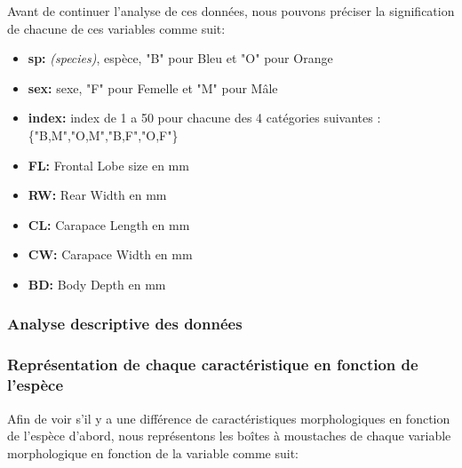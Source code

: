 \documentclass[10pt]{article}
\begin{document}
	Avant de continuer l'analyse de ces données, nous pouvons préciser la signification de chacune de ces variables comme suit:
	\begin{itemize}
		\item \textbf{sp:} \textit{(species)}, espèce, "B" pour Bleu et "O" pour Orange
		\item \textbf{sex:} sexe, "F" pour Femelle et "M" pour Mâle
		\item \textbf{index:} index de 1 a 50 pour chacune des 4 catégories suivantes : \{"B,M","O,M","B,F","O,F"\}
		\item \textbf{FL:} Frontal Lobe size en mm
		\item \textbf{RW:} Rear Width en mm
		\item \textbf{CL:} Carapace Length en mm
		\item \textbf{CW:} Carapace Width en mm 
		\item \textbf{BD:} Body Depth en mm
	\end{itemize}
	
	\subsubsection{Analyse descriptive des données}
	
	\subsubsection{Représentation de chaque caractéristique en fonction de l'espèce}
	
	Afin de voir s'il y a une différence de caractéristiques morphologiques en fonction de l'espèce d'abord, nous représentons les boîtes à moustaches de chaque variable morphologique en fonction de la variable  comme suit:
	
\end{document}
